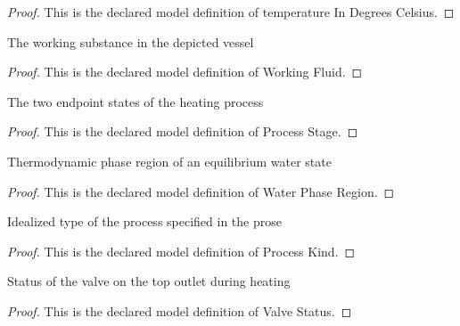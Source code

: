 \begin{proof}
  This is the declared model definition of temperature In Degrees Celsius.
\end{proof}
\begin{definition}
  \label{def:physics:phyx-mini-0451:phyxminiproblems-problemphyxmini0451-workingfluid}
  The working substance in the depicted vessel
\end{definition}
\begin{proof}
  This is the declared model definition of Working Fluid.
\end{proof}
\begin{definition}
  \label{def:physics:phyx-mini-0451:phyxminiproblems-problemphyxmini0451-processstage}
  The two endpoint states of the heating process
\end{definition}
\begin{proof}
  This is the declared model definition of Process Stage.
\end{proof}
\begin{definition}
  \label{def:physics:phyx-mini-0451:phyxminiproblems-problemphyxmini0451-waterphaseregion}
  Thermodynamic phase region of an equilibrium water state
\end{definition}
\begin{proof}
  This is the declared model definition of Water Phase Region.
\end{proof}
\begin{definition}
  \label{def:physics:phyx-mini-0451:phyxminiproblems-problemphyxmini0451-processkind}
  Idealized type of the process specified in the prose
\end{definition}
\begin{proof}
  This is the declared model definition of Process Kind.
\end{proof}
\begin{definition}
  \label{def:physics:phyx-mini-0451:phyxminiproblems-problemphyxmini0451-valvestatus}
  Status of the valve on the top outlet during heating
\end{definition}
\begin{proof}
  This is the declared model definition of Valve Status.
\end{proof}
